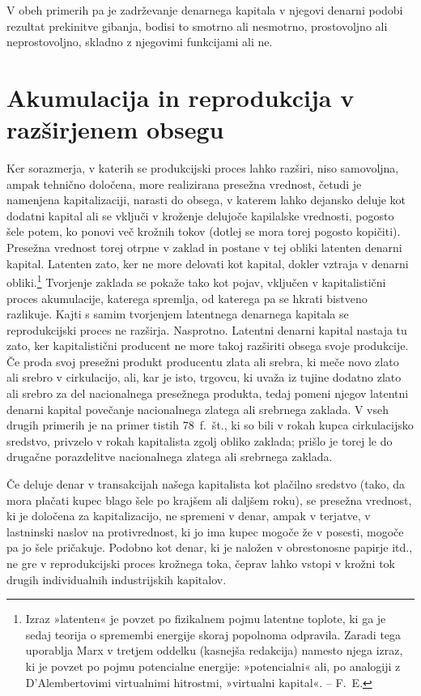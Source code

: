 \documentclass[kapital_02.tex]{subfiles}
\begin{document}
V obeh primerih pa je zadrževanje denarnega kapitala v njegovi denarni podobi rezultat prekinitve gibanja, bodisi to smotrno ali nesmotrno, prostovoljno ali neprostovoljno, skladno z njegovimi funkcijami ali ne.

\section{Akumulacija in reprodukcija v razširjenem obsegu}

Ker sorazmerja, v katerih se produkcijski proces lahko razširi, niso samovoljna, ampak tehnično določena, more realizirana presežna vrednost, četudi je namenjena kapitalizaciji, narasti do obsega, v katerem lahko dejansko deluje kot \KPEstran dodatni kapital ali se vključi v kroženje delujoče kapilalske vrednosti, pogosto šele potem, ko ponovi več krožnih tokov (dotlej se mora torej pogosto kopičiti). Presežna vrednost torej otrpne v zaklad in postane v tej obliki latenten denarni kapital. Latenten zato, ker ne more delovati kot kapital, dokler vztraja v denarni obliki.\footnote{Izraz »latenten« je povzet po fizikalnem pojmu latentne toplote, ki ga je sedaj teorija o spremembi energije skoraj popolnoma odpravila. Zaradi tega uporablja Marx v tretjem oddelku (kasnejša redakcija) namesto njega izraz, ki je povzet po pojmu potencialne energije: »potencialni« ali, po analogiji z D'Alembertovimi virtualnimi hitrostmi, »virtualni kapital«. -- F.\ E.} Tvorjenje zaklada se pokaže tako kot pojav, vključen v kapitalistični proces akumulacije, katerega spremlja, od katerega pa se hkrati bistveno razlikuje. Kajti s samim tvorjenjem latentnega denarnega kapitala se reprodukcijski proces ne razširja. Nasprotno. Latentni denarni kapital nastaja tu zato, ker kapitalistični producent ne more takoj razširiti obsega svoje produkcije. Če proda svoj presežni produkt producentu zlata ali srebra, ki meče novo zlato ali srebro v cirkulacijo, ali, kar je isto, trgovcu, ki uvaža iz tujine dodatno zlato ali srebro za del nacionalnega presežnega produkta, tedaj pomeni njegov latentni denarni kapital povečanje nacionalnega zlatega ali srebrnega zaklada. V vseh drugih primerih je na primer tistih 78\ f.\ št., ki so bili v rokah kupca cirkulacijsko sredstvo, privzelo v rokah kapitalista zgolj obliko zaklada; prišlo je torej le do drugačne porazdelitve nacionalnega zlatega ali srebrnega zaklada.

Če deluje denar v transakcijah našega kapitalista kot plačilno sredstvo (tako, da mora plačati kupec blago šele po krajšem ali daljšem roku), se presežna vrednost, ki je določena za kapitalizacijo, ne spremeni v denar, ampak v terjatve, v lastninski naslov na protivrednost, ki jo ima kupec mogoče že v posesti, mogoče pa jo šele pričakuje. Podobno kot denar, ki je naložen v obrestonosne papirje itd., ne gre v reprodukcijski proces krožnega toka, čeprav lahko vstopi v krožni tok drugih individualnih industrijskih kapitalov.
\end{document}
